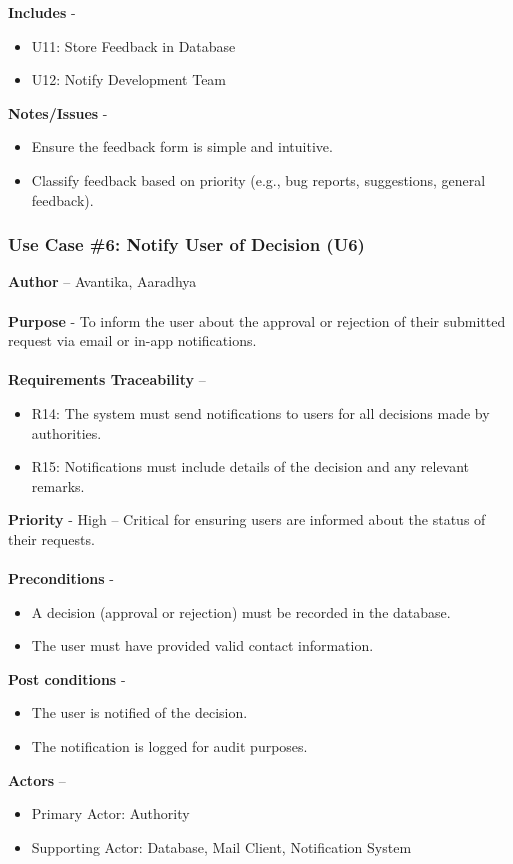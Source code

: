 \documentclass[a4paper,12pt]{article}
\begin{document}
\textbf{Includes} - 
\begin{itemize} 
    \item U11: Store Feedback in Database
    \item U12: Notify Development Team
\end{itemize}
\textbf{Notes/Issues} - 
\begin{itemize} 
    \item Ensure the feedback form is simple and intuitive.
    \item Classify feedback based on priority (e.g., bug reports, suggestions, general feedback).
\end{itemize}
\newpage
 \subsubsection{Use Case \#6: Notify User of Decision (U6)}
\textbf{Author} – Avantika, Aaradhya \\\\
\textbf{Purpose} - To inform the user about the approval or rejection of their submitted request via email or in-app notifications. \\\\
\textbf{Requirements Traceability} – 
\begin{itemize} 
    \item R14: The system must send notifications to users for all decisions made by authorities.
    \item R15: Notifications must include details of the decision and any relevant remarks.
\end{itemize}
\textbf{Priority} - High – Critical for ensuring users are informed about the status of their requests. \\\\
\textbf{Preconditions} - 
\begin{itemize} 
    \item A decision (approval or rejection) must be recorded in the database.
    \item The user must have provided valid contact information.
\end{itemize}
\textbf{Post conditions} - 
\begin{itemize} 
    \item The user is notified of the decision.
    \item The notification is logged for audit purposes.
\end{itemize}
\textbf{Actors} – 
\begin{itemize} 
    \item Primary Actor: Authority
    \item Supporting Actor: Database, Mail Client, Notification System
\end{itemize}
\end{document}
